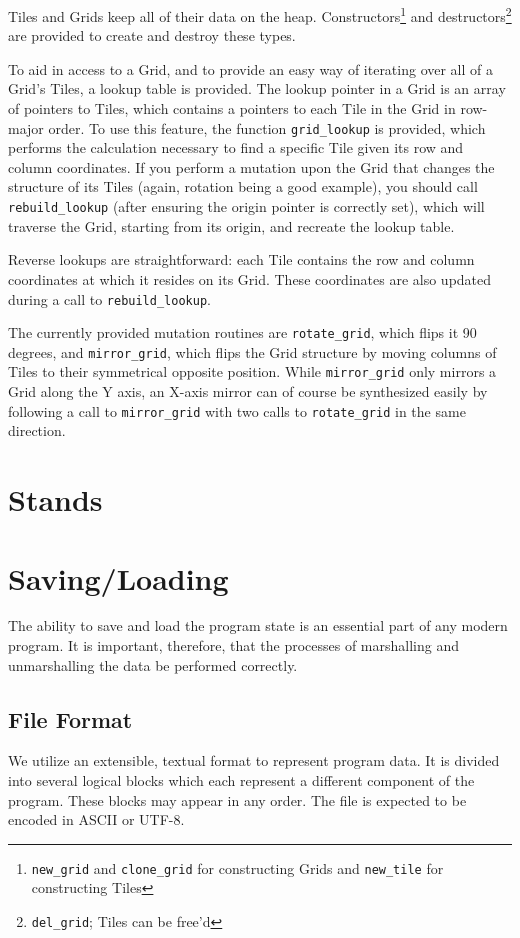 \documentclass{report}
\begin{document}
Tiles and Grids keep all of their data on the heap. Constructors\footnote{
	\texttt{new_grid} and \texttt{clone_grid} for constructing Grids
	and \texttt{new_tile} for constructing Tiles}
and destructors\footnote{\texttt{del_grid}; Tiles can be free'd} are provided
to create and destroy these types.

To aid in access to a Grid, and to provide an easy way of iterating over all
of a Grid's Tiles, a lookup table is provided. The lookup pointer in a Grid is
an array of pointers to Tiles, which contains a pointers to each Tile in the
Grid in row-major order. To use this feature, the function \texttt{grid_lookup}
is provided, which performs the calculation necessary to find a specific Tile
given its row and column coordinates. If you perform a mutation upon the Grid
that changes the structure of its Tiles (again, rotation being a good example),
you should call \texttt{rebuild_lookup} (after ensuring the origin pointer
is correctly set), which will traverse the Grid, starting from its origin, and
recreate the lookup table.

Reverse lookups are straightforward: each Tile contains the row and column
coordinates at which it resides on its Grid. These coordinates are also
updated during a call to \texttt{rebuild_lookup}.

The currently provided mutation routines are \texttt{rotate_grid}, which
flips it 90 degrees, and \texttt{mirror_grid}, which flips the Grid structure
by moving columns of Tiles to their symmetrical opposite position.
While \texttt{mirror_grid} only mirrors a Grid along the Y axis, an X-axis
mirror can of course be synthesized easily by following a call to
\texttt{mirror_grid} with two calls to \texttt{rotate_grid}
in the same direction.

\section{Stands}

\section{Saving/Loading}
The ability to save and load the program state is an essential part of
any modern program. It is important, therefore, that the processes of
marshalling and unmarshalling the data be performed correctly.

\subsection{File Format}
We utilize an extensible, textual format to represent program data.
It is divided into several logical blocks which each represent a different
component of the program. These blocks may appear in any order. The file
is expected to be encoded in ASCII or UTF-8.
\end{document}
